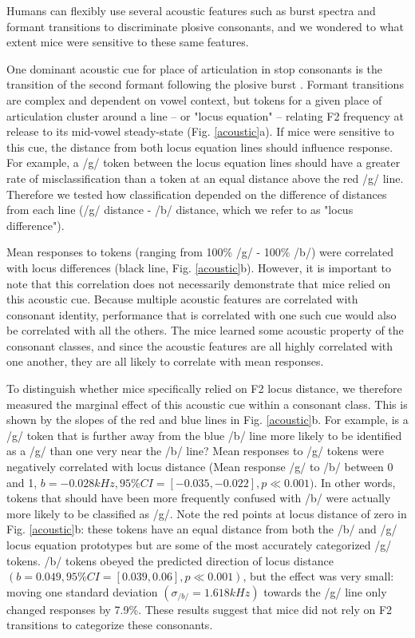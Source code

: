 \documentclass[11pt]{article}\usepackage[]{graphicx}\usepackage[]{color}
\begin{document}
Humans can flexibly use several acoustic features such as burst spectra and formant transitions to discriminate plosive consonants, and we wondered to what extent mice were sensitive to these same features.

One dominant acoustic cue for place of articulation in stop consonants is the transition of the second formant following the plosive burst \cite{Wright2004,Sussman1998,Lindblom2012}. Formant transitions are complex and dependent on vowel context, but tokens for a given place of articulation cluster around a line -- or "locus equation" -- relating F2 frequency at release to its mid-vowel steady-state \cite{Sussman1998,Lindblom2012} (Fig. \ref{acoustic}a).  If mice were sensitive to this cue, the distance from both locus equation lines should influence response. For example, a /g/ token between the locus equation lines should have a greater rate of misclassification than a token at an equal distance above the red /g/ line. Therefore we tested how classification depended on the difference of distances from each line (/g/ distance - /b/ distance, which we refer to as "locus difference").

Mean responses to tokens (ranging from 100\% /g/ - 100\% /b/) were correlated with locus differences (black line, Fig. \ref{acoustic}b). However, it is important to note that this correlation does not necessarily demonstrate that mice relied on this acoustic cue. Because multiple acoustic features are correlated with consonant identity, performance that is correlated with one such cue would also be correlated with all the others. The mice learned some acoustic property of the consonant classes, and since the acoustic features are all highly correlated with one another, they are all likely to correlate with mean responses.

To distinguish whether mice specifically relied on F2 locus distance, we therefore measured the marginal effect of this acoustic cue within a consonant class. This is shown by the slopes of the red and blue lines in Fig. \ref{acoustic}b. For example, is a /g/ token that is further away from the blue /b/ line more likely to be identified as a /g/ than one very near the /b/ line? Mean responses to /g/ tokens were negatively correlated with locus distance (Mean response /g/ to /b/ between 0 and 1, $b=-0.028kHz, 95\% CI = [-0.035, -0.022], p \ll 0.001)$. In other words, tokens that should have been more frequently confused with /b/ were actually more likely to be classified as /g/. Note the red points at locus distance of zero in Fig. \ref{acoustic}b: these tokens have an equal distance from both the /b/ and /g/ locus equation prototypes but are some of the most accurately categorized /g/ tokens. /b/ tokens obeyed the predicted direction of locus distance $ (b=0.049, 95\% CI = [0.039, 0.06], p \ll 0.001) $, but the effect was very small: moving one standard deviation $ (\sigma_{/b/}=1.618kHz) $ towards the /g/ line only changed responses by 7.9\%. These results suggest that mice did not rely on F2 transitions to categorize these consonants.
\end{document}
